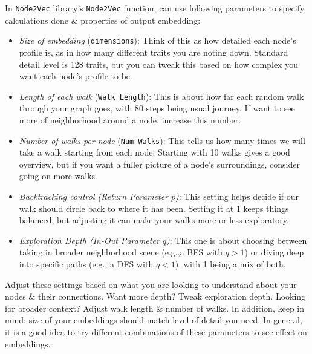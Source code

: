 \documentclass{article}
\begin{document}
\begin{itemize}
\begin{itemize}
\begin{itemize}
           In {\tt Node2Vec} library's {\tt Node2Vec} function, can use following parameters to specify calculations done \& properties of output embedding:
           \begin{itemize}
               \item {\it Size of embedding} ({\tt dimensions}): Think of this as how detailed each node's profile is, as in how many different traits you are noting down. Standard detail level is 128 traits, but you can tweak this based on how complex you want each node's profile to be.
               \item {\it Length of each walk} ({\tt Walk Length}): This is about how far each random walk through your graph goes, with 80 steps being usual journey. If want to see more of neighborhood around a node, increase this number.
               \item {\it Number of walks per node} ({\tt Num Walks}): This tells us how many times we will take a walk starting from each node. Starting with 10 walks gives a good overview, but if you want a fuller picture of a node's surroundings, consider going on more walks.
               \item {\it Backtracking control (Return Parameter $p$)}: This setting helps decide if our walk should circle back to where it has been. Setting it at 1 keeps things balanced, but adjusting it can make your walks more or less exploratory.
               \item {\it Exploration Depth (In-Out Parameter $q$)}: This one is about choosing between taking in broader neighborhood scene (e.g.,a BFS with $q > 1$) or diving deep into specific paths (e.g., a DFS with $q < 1$), with 1 being a mix of both.
           \end{itemize}
           Adjust these settings based on what you are looking to understand about your nodes \& their connections. Want more depth? Tweak exploration depth. Looking for broader context? Adjust walk length \& number of walks. In addition, keep in mind: size of your embeddings should match level of detail you need. In general, it is a good idea to try different combinations of these parameters to see effect on embeddings.


\end{itemize}
\end{itemize}
\end{itemize}
\end{document}
